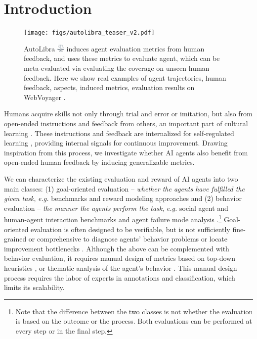 \section{Introduction}
\begin{figure}[!t]
    \centering
    \texttt{[image: figs/autolibra\_teaser\_v2.pdf]}
    \caption{AutoLibra \protect\includegraphics[height=1em]{figs/scale.png} induces agent evaluation metrics from human feedback, and uses these metrics to evaluate agent, which can be meta-evaluated via evaluating the coverage on unseen human feedback. Here we show real examples of agent trajectories, human feedback, aspects, induced metrics, evaluation results on WebVoyager \citep{he2024webvoyager}.}
    \label{fig:teaser}
\end{figure}

Humans acquire skills not only through trial and error or imitation, but also from open-ended instructions and feedback from others, an important part of cultural learning \citep{tomasello1993cultural}.  
These instructions and feedback are internalized for self-regulated learning
\citep{pintrich2002development,nicol2006formative},
providing internal signals for continuous improvement. 
Drawing inspiration from this process, we investigate whether AI agents also benefit from open-ended human feedback by inducing generalizable metrics. 

We can characterize the existing evaluation and reward of AI agents
into two main classes: (1) goal-oriented evaluation --
\emph{whether the agents have fulfilled the given task},
\emph{e.g.} benchmarks \citep{zhouwebarena,jimenezswe,chan2024mle,paglieri2024balrog} and reward
modeling approaches \citep{pan2024autonomous,chen2025scaling,choudhury2025process}
and (2) behavior evaluation -- \emph{the manner the agents perform the task},
\emph{e.g.} social agent and human-agent interaction benchmarks \citep{zhousotopia,shao2024collaborative}
and agent failure mode analysis \citep{pan2025why,zhang2023effects,yang2023behavioral}.\footnote{Note that the difference between the two classes is not whether the evaluation is based on the outcome or the process.
Both evaluations can be performed at every step or in the final step.}
Goal-oriented evaluation is often designed to be verifiable, but is not sufficiently fine-grained
or comprehensive to diagnose agents' behavior problems or locate improvement bottlenecks \citep{yehudai2025survey}.  
Although the above can be complemented with behavior evaluation, it requires manual design of metrics based on top-down heuristics
\citep{zhousotopia}, or thematic analysis of the agent's behavior \citep{shao2024collaborative,pan2025why}.
This manual design process requires the labor of experts in annotations and classification, which limits its scalability.

